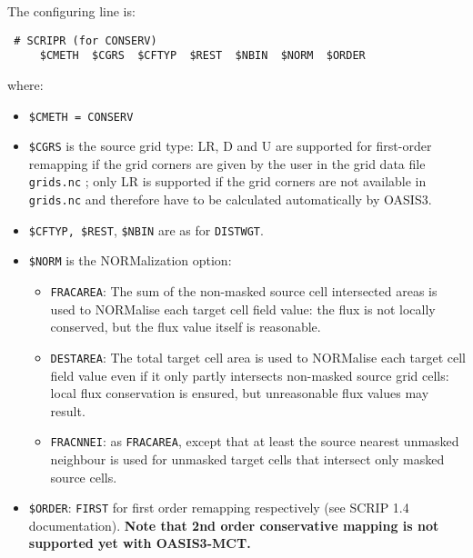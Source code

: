 \begin{itemize}
\begin{itemize}
  The configuring line is:
  \begin{verbatim}
 # SCRIPR (for CONSERV)
     $CMETH  $CGRS  $CFTYP  $REST  $NBIN  $NORM  $ORDER 
  \end{verbatim}
\vspace{-0.5cm} 
where: 
  \begin{itemize}
  \item {\tt \$CMETH = CONSERV} 
  \item {\tt \$CGRS} is the source grid type: LR, D and U are
  supported for first-order remapping if the grid corners are given by
  the user in the grid data file {\tt grids.nc} ; only LR
  is supported if the grid corners are not available in {\tt grids.nc} 
  and therefore have to be calculated automatically by
  OASIS3. 
  \item {\tt \$CFTYP, \$REST}, {\tt \$NBIN} are as for {\tt DISTWGT}. 
  \item {\tt \$NORM} is the NORMalization option:
  \begin{itemize}
   \item {\tt FRACAREA}: The sum of the non-masked source cell intersected areas
    is used to NORMalise each target cell field value: the flux is not
    locally conserved, but the flux value itself is reasonable.
   \item {\tt DESTAREA}: The total target cell area is used to NORMalise
    each target cell field value even if it only partly intersects
    non-masked source grid cells: local flux conservation is ensured,
    but unreasonable flux values may result.
   \item {\tt FRACNNEI}: as {\tt FRACAREA}, except that at least the
    source nearest unmasked neighbour is used for unmasked target
    cells that intersect only masked source cells. 
  \end{itemize} 
  \item {\tt \$ORDER}: {\tt FIRST} for first order remapping respectively (see SCRIP 1.4 documentation). {\bf Note that 2nd order conservative mapping
  is not supported yet with OASIS3-MCT.}

\end{itemize}


\end{itemize}
\end{itemize}

